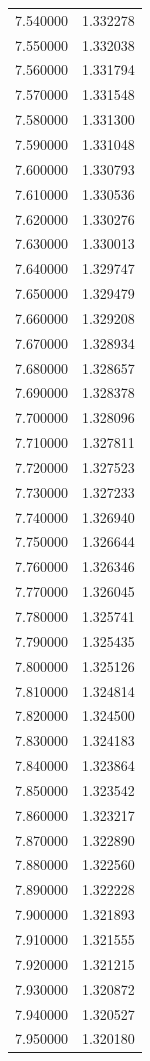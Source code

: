 \begin{tabular}{rr}
7.540000 & 1.332278 \\
7.550000 & 1.332038 \\
7.560000 & 1.331794 \\
7.570000 & 1.331548 \\
7.580000 & 1.331300 \\
7.590000 & 1.331048 \\
7.600000 & 1.330793 \\
7.610000 & 1.330536 \\
7.620000 & 1.330276 \\
7.630000 & 1.330013 \\
7.640000 & 1.329747 \\
7.650000 & 1.329479 \\
7.660000 & 1.329208 \\
7.670000 & 1.328934 \\
7.680000 & 1.328657 \\
7.690000 & 1.328378 \\
7.700000 & 1.328096 \\
7.710000 & 1.327811 \\
7.720000 & 1.327523 \\
7.730000 & 1.327233 \\
7.740000 & 1.326940 \\
7.750000 & 1.326644 \\
7.760000 & 1.326346 \\
7.770000 & 1.326045 \\
7.780000 & 1.325741 \\
7.790000 & 1.325435 \\
7.800000 & 1.325126 \\
7.810000 & 1.324814 \\
7.820000 & 1.324500 \\
7.830000 & 1.324183 \\
7.840000 & 1.323864 \\
7.850000 & 1.323542 \\
7.860000 & 1.323217 \\
7.870000 & 1.322890 \\
7.880000 & 1.322560 \\
7.890000 & 1.322228 \\
7.900000 & 1.321893 \\
7.910000 & 1.321555 \\
7.920000 & 1.321215 \\
7.930000 & 1.320872 \\
7.940000 & 1.320527 \\
7.950000 & 1.320180 \\

\end{tabular}
